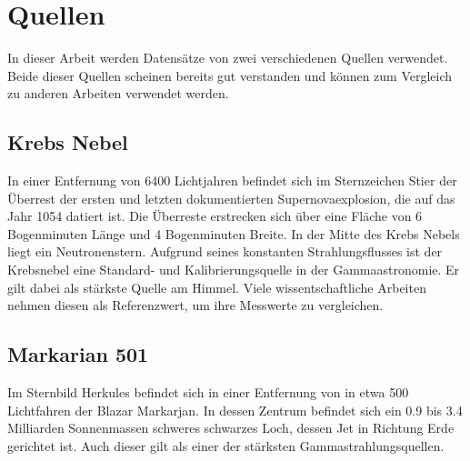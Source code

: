 \chapter{Quellen}
In dieser Arbeit werden Datensätze von zwei verschiedenen Quellen verwendet. 
Beide dieser Quellen scheinen bereits gut verstanden und können zum Vergleich zu anderen Arbeiten verwendet werden.
\section{Krebs Nebel}
In einer Entfernung von 6400 Lichtjahren befindet sich im Sternzeichen Stier der Überrest der ersten und letzten dokumentierten Supernovaexplosion, die auf das Jahr 1054 datiert ist. 
Die Überreste erstrecken sich über eine Fläche von 6 Bogenminuten Länge und 4 Bogenminuten Breite. 
In der Mitte des Krebs Nebels liegt ein Neutronenstern.
Aufgrund seines konstanten Strahlungsflusses ist der Krebsnebel eine Standard- und Kalibrierungsquelle in der Gammaastronomie.
Er gilt dabei als stärkste Quelle am Himmel. 
Viele wissentschaftliche Arbeiten nehmen diesen als Referenzwert, um ihre Messwerte zu vergleichen. 

\section{Markarian 501}
Im Sternbild Herkules befindet sich in einer Entfernung von in etwa 500 Lichtfahren der Blazar Markarjan. 
In dessen Zentrum befindet sich ein \num{0.9} bis \num{3.4} Milliarden Sonnenmassen schweres schwarzes Loch, dessen Jet in Richtung Erde gerichtet ist.
Auch dieser gilt als einer der stärksten Gammastrahlungsquellen.
